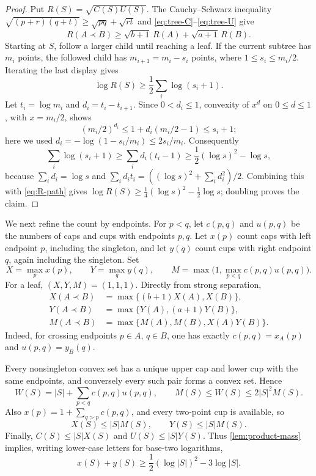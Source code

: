 \documentclass[11pt]{article}
\theoremstyle{remark}
\begin{document}
\begin{proof}
Put $R(S)=\sqrt{C(S)U(S)}$.  The Cauchy--Schwarz inequality
$\sqrt{(p+r)(q+t)}\ge\sqrt{pq}+\sqrt{rt}$ and
\eqref{eq:tree-C}--\eqref{eq:tree-U} give
\[
 R(A\prec B)\ge \sqrt{b+1}\,R(A)+\sqrt{a+1}\,R(B).
\]
Starting at $S$, follow a larger child until reaching a leaf.  If the
current subtree has $m_i$ points, the followed child has
$m_{i+1}=m_i-s_i$ points, where $1\le s_i\le m_i/2$.  Iterating the last
display gives
\begin{equation}
 \log R(S)\ge\frac12\sum_i\log(s_i+1).
 \label{eq:R-path}
\end{equation}
Let $t_i=\log m_i$ and $d_i=t_i-t_{i+1}$.  Since $0<d_i\le1$, convexity of
$x^d$ on $0\le d\le1$, with $x=m_i/2$, shows
\[
 (m_i/2)^{d_i}\le1+d_i(m_i/2-1)\le s_i+1;
\]
here we used $d_i=-\log(1-s_i/m_i)\le2s_i/m_i$.  Consequently
\[
 \sum_i\log(s_i+1)
 \ge\sum_i d_i(t_i-1)
 \ge\frac12(\log s)^2-\log s,
\]
because $\sum_i d_i=\log s$ and
$\sum_i d_it_i=((\log s)^2+\sum_i d_i^2)/2$.  Combining this with
\eqref{eq:R-path} gives
$\log R(S)\ge\frac14(\log s)^2-\frac12\log s$; doubling proves
the claim.
\end{proof}

We next refine the count by endpoints.  For $p<q$, let $c(p,q)$ and
$u(p,q)$ be the numbers of caps and cups with endpoints $p,q$.  Let $x(p)$
count caps with left endpoint $p$, including the singleton, and let $y(q)$
count cups with right endpoint $q$, again including the singleton.  Set
\[
 X=\max_p x(p),\qquad Y=\max_q y(q),\qquad
 M=\max\bigl(1,\max_{p<q}c(p,q)u(p,q)\bigr).
\]
For a leaf, $(X,Y,M)=(1,1,1)$.  Directly from strong separation,
\begin{align}
 X(A\prec B)&=\max\{(b+1)X(A),X(B)\},\label{eq:X-rec}\\
 Y(A\prec B)&=\max\{Y(A),(a+1)Y(B)\},\label{eq:Y-rec}\\
 M(A\prec B)&=\max\{M(A),M(B),X(A)Y(B)\}.\label{eq:M-rec}
\end{align}
Indeed, for crossing endpoints $p\in A$, $q\in B$, one has exactly
$c(p,q)=x_A(p)$ and $u(p,q)=y_B(q)$.

Every nonsingleton convex set has a unique upper cap and lower cup with the
same endpoints, and conversely every such pair forms a convex set.  Hence
\begin{equation}
 W(S)=|S|+\sum_{p<q}c(p,q)u(p,q),
 \qquad M(S)\le W(S)\le2|S|^2M(S).
 \label{eq:WM}
\end{equation}
Also $x(p)=1+\sum_{q>p}c(p,q)$, and every two-point cup is available, so
\begin{equation}
 X(S)\le |S|M(S),\qquad Y(S)\le |S|M(S).
 \label{eq:XY-ceiling}
\end{equation}
Finally, $C(S)\le |S|X(S)$ and $U(S)\le |S|Y(S)$.  Thus
\cref{lem:product-mass} implies, writing lower-case letters for base-two
logarithms,
\begin{equation}
 x(S)+y(S)\ge\frac12(\log|S|)^2-3\log|S|.
 \label{eq:radial}
\end{equation}
\end{document}
